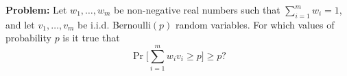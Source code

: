{\bf Problem:} Let $w_1, \ldots, w_m$ be non-negative real numbers such that $\sum_{i=1}^m w_i=1$, and let 
$v_1, \ldots, v_m$ be i.i.d. Bernoulli$(p)$ random variables. For which values of probability $p$ is it true that
\[\Pr\Big[\sum_{i=1}^m w_i v_i\geq p\Big]\geq p?\]